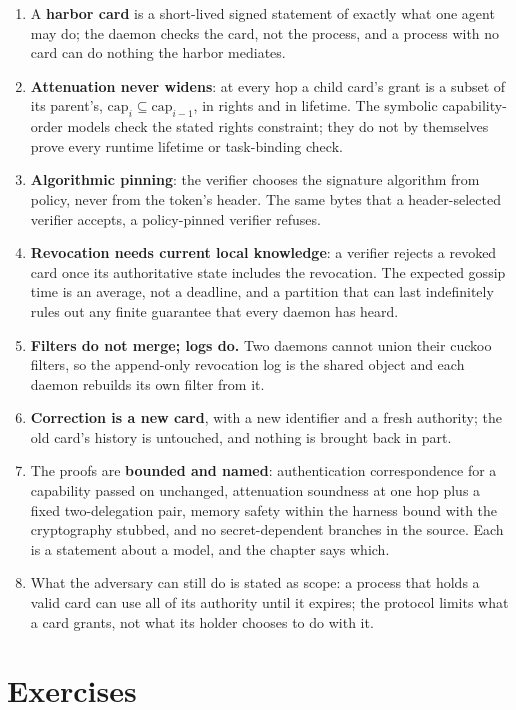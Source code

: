 \documentclass[11pt,a4paper]{article}
\theoremstyle{definition}
\begin{document}
\begin{enumerate}[leftmargin=1.6em,itemsep=2pt]
\item A \textbf{harbor card} is a short-lived signed statement of exactly what one agent may do; the daemon checks the card, not the process, and a process with no card can do nothing the harbor mediates.
\item \textbf{Attenuation never widens}: at every hop a child card's grant is a subset of its parent's, $\mathrm{cap}_i \subseteq \mathrm{cap}_{i-1}$, in rights and in lifetime. The symbolic capability-order models check the stated rights constraint; they do not by themselves prove every runtime lifetime or task-binding check.
\item \textbf{Algorithmic pinning}: the verifier chooses the signature algorithm from policy, never from the token's header. The same bytes that a header-selected verifier accepts, a policy-pinned verifier refuses.
\item \textbf{Revocation needs current local knowledge}: a verifier rejects a revoked card once its authoritative state includes the revocation. The expected gossip time is an average, not a deadline, and a partition that can last indefinitely rules out any finite guarantee that every daemon has heard.
\item \textbf{Filters do not merge; logs do.} Two daemons cannot union their cuckoo filters, so the append-only revocation log is the shared object and each daemon rebuilds its own filter from it.
\item \textbf{Correction is a new card}, with a new identifier and a fresh authority; the old card's history is untouched, and nothing is brought back in part.
\item The proofs are \textbf{bounded and named}: authentication correspondence for a capability passed on unchanged, attenuation soundness at one hop plus a fixed two-delegation pair, memory safety within the harness bound with the cryptography stubbed, and no secret-dependent branches in the source. Each is a statement about a model, and the chapter says which.
\item What the adversary can still do is stated as scope: a process that holds a valid card can use all of its authority until it expires; the protocol limits what a card grants, not what its holder chooses to do with it.
\end{enumerate}

\section{Exercises}
\label{sec:anchor-exercises}
\end{document}
